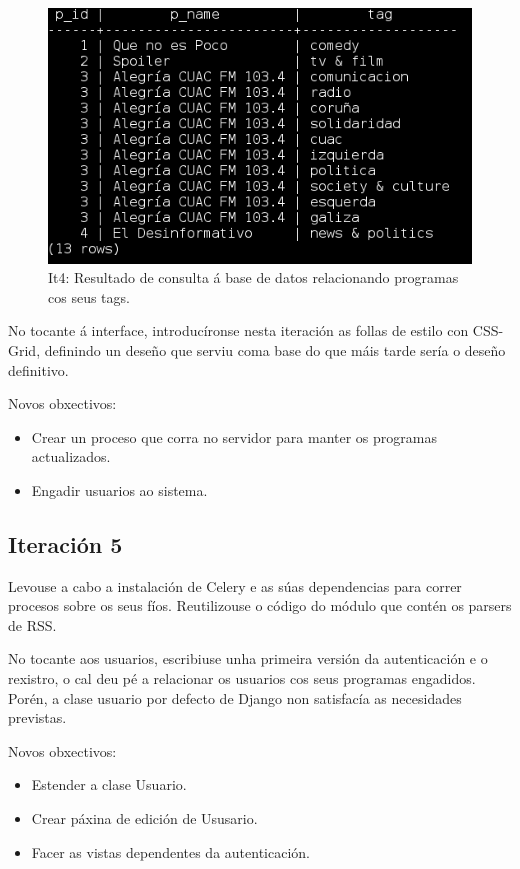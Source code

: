 \begin{figure}[h]
	\centering
	\includegraphics[scale=0.6,keepaspectratio=true]{./images/tags.png}
	\caption{It4: Resultado de consulta á base de datos relacionando programas cos seus tags.}
	\label{fig:it4_tag}
\end{figure}

No tocante á interface, introducíronse nesta iteración as follas de estilo con CSS-Grid, definindo un deseño que serviu coma base do que máis tarde sería o deseño definitivo.

Novos obxectivos:

\begin{itemize}
	\item Crear un proceso que corra no servidor para manter os programas actualizados.
	\item Engadir usuarios ao sistema. 
\end{itemize}

\subsection{Iteración 5}

Levouse a cabo a instalación de Celery e as súas dependencias para correr procesos sobre os seus fíos. Reutilizouse o código do módulo que contén os parsers de RSS. 

No tocante aos usuarios, escribiuse unha primeira versión da autenticación e o rexistro, o cal deu pé a relacionar os usuarios cos seus programas engadidos. Porén, a clase usuario por defecto de Django non satisfacía as necesidades previstas.

Novos obxectivos:

\begin{itemize}
	\item Estender a clase Usuario.
	\item Crear páxina de edición de Ususario.
	\item Facer as vistas dependentes da autenticación.
\end{itemize}


